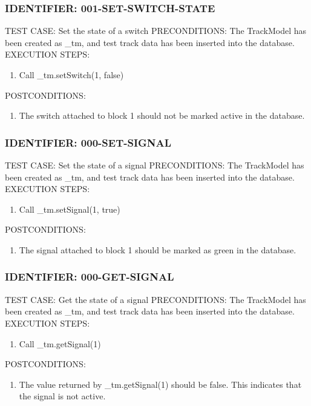 \documentclass{scrreprt}
\begin{document}
\subsubsection{IDENTIFIER: 001-SET-SWITCH-STATE}
TEST CASE: Set the state of a switch
PRECONDITIONS: The TrackModel has been created as _tm, and test track data has been inserted into the database.
EXECUTION STEPS:
\begin{enumerate}
	\item Call _tm.setSwitch(1, false)
\end{enumerate}
POSTCONDITIONS:
\begin{enumerate}
	\item The switch attached to block 1 should not be marked active in the database. 
\end{enumerate}

\subsubsection{IDENTIFIER: 000-SET-SIGNAL}
TEST CASE: Set the state of a signal
PRECONDITIONS: The TrackModel has been created as _tm, and test track data has been inserted into the database.
EXECUTION STEPS:
\begin{enumerate}
	\item Call _tm.setSignal(1, true)
\end{enumerate}
POSTCONDITIONS:
\begin{enumerate}
	\item The signal attached to block 1 should be marked as green in the database.
\end{enumerate}

\subsubsection{IDENTIFIER: 000-GET-SIGNAL}
TEST CASE: Get the state of a signal
PRECONDITIONS: The TrackModel has been created as _tm, and test track data has been inserted into the database.
EXECUTION STEPS:
\begin{enumerate}
	\item Call _tm.getSignal(1)
\end{enumerate}
POSTCONDITIONS:
\begin{enumerate}
	\item The value returned by _tm.getSignal(1) should be false. This indicates that the signal is not active.
\end{enumerate}
\end{document}
